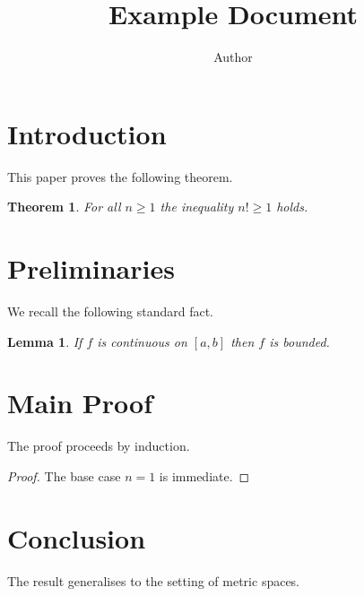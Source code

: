 \documentclass{article}
\title{Example Document}
\author{Author}
\date{}
\newtheorem{theorem}{Theorem}
\newtheorem{lemma}{Lemma}
\begin{document}
\maketitle

\section{Introduction}

This paper proves the following theorem.

\begin{theorem}
	For all $n \geq 1$ the inequality $n! \geq 1$ holds.
\end{theorem}

\section{Preliminaries}

We recall the following standard fact.

\begin{lemma}
	If $f$ is continuous on $[a, b]$ then $f$ is bounded.
\end{lemma}

\section{Main Proof}

The proof proceeds by induction.

\begin{proof}
	The base case $n = 1$ is immediate.
\end{proof}

\section{Conclusion}

The result generalises to the setting of metric spaces.
\end{document}
